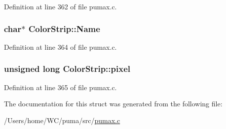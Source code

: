 \-Definition at line 362 of file pumax.\-c.

\hypertarget{struct_color_strip_a8be72b425d4dae5555815f0108a2a2b9}{
\subsubsection[{\-Name}]{\setlength{\rightskip}{0pt plus 5cm}char$\ast$ {\bf \-Color\-Strip\-::\-Name}}}
\label{struct_color_strip_a8be72b425d4dae5555815f0108a2a2b9}


\-Definition at line 364 of file pumax.\-c.

\hypertarget{struct_color_strip_ab1a6137a580d2a1817f4d8e127d4743c}{
\subsubsection[{pixel}]{\setlength{\rightskip}{0pt plus 5cm}unsigned long {\bf \-Color\-Strip\-::pixel}}}
\label{struct_color_strip_ab1a6137a580d2a1817f4d8e127d4743c}


\-Definition at line 365 of file pumax.\-c.



\-The documentation for this struct was generated from the following file\-:\begin{DoxyCompactItemize}
\item 
/\-Users/home/\-W\-C/puma/src/\hyperlink{pumax_8c}{pumax.\-c}\end{DoxyCompactItemize}
